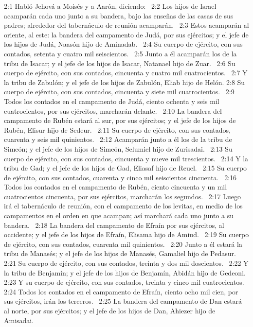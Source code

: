 2:1 Habló Jehová a Moisés y a Aarón, diciendo:  
2:2 Los hijos de Israel acamparán cada uno junto a su bandera, bajo las enseñas de las casas de sus padres; alrededor del tabernáculo de reunión acamparán.  
2:3 Estos acamparán al oriente, al este: la bandera del campamento de Judá, por sus ejércitos; y el jefe de los hijos de Judá, Naasón hijo de Aminadab.  
2:4 Su cuerpo de ejército, con sus contados, setenta y cuatro mil seiscientos.  
2:5 Junto a él acamparán los de la tribu de Isacar; y el jefe de los hijos de Isacar, Natanael hijo de Zuar.  
2:6 Su cuerpo de ejército, con sus contados, cincuenta y cuatro mil cuatrocientos.  
2:7 Y la tribu de Zabulón; y el jefe de los hijos de Zabulón, Eliab hijo de Helón. 
2:8 Su cuerpo de ejército, con sus contados, cincuenta y siete mil cuatrocientos.  
2:9 Todos los contados en el campamento de Judá, ciento ochenta y seis mil cuatrocientos, por sus ejércitos, marcharán delante.  
2:10 La bandera del campamento de Rubén estará al sur, por sus ejércitos; y el jefe de los hijos de Rubén, Elisur hijo de Sedeur.  
2:11 Su cuerpo de ejército, con sus contados, cuarenta y seis mil quinientos.  
2:12 Acamparán junto a él los de la tribu de Simeón; y el jefe de los hijos de Simeón, Selumiel hijo de Zurisadai.  
2:13 Su cuerpo de ejército, con sus contados, cincuenta y nueve mil trescientos.  
2:14 Y la tribu de Gad; y el jefe de los hijos de Gad, Eliasaf hijo de Reuel.  
2:15 Su cuerpo de ejército, con sus contados, cuarenta y cinco mil seiscientos cincuenta.  
2:16 Todos los contados en el campamento de Rubén, ciento cincuenta y un mil cuatrocientos cincuenta, por sus ejércitos, marcharán los segundos.  
2:17 Luego irá el tabernáculo de reunión, con el campamento de los levitas, en medio de los campamentos en el orden en que acampan; así marchará cada uno junto a su bandera.  
2:18 La bandera del campamento de Efraín por sus ejércitos, al occidente; y el jefe de los hijos de Efraín, Elisama hijo de Amiud.  
2:19 Su cuerpo de ejército, con sus contados, cuarenta mil quinientos.  
2:20 Junto a él estará la tribu de Manasés; y el jefe de los hijos de Manasés, Gamaliel hijo de Pedasur.  
2:21 Su cuerpo de ejército, con sus contados, treinta y dos mil doscientos.  
2:22 Y la tribu de Benjamín; y el jefe de los hijos de Benjamín, Abidán hijo de Gedeoni.  
2:23 Y su cuerpo de ejército, con sus contados, treinta y cinco mil cuatrocientos.  
2:24 Todos los contados en el campamento de Efraín, ciento ocho mil cien, por sus ejércitos, irán los terceros.  
2:25 La bandera del campamento de Dan estará al norte, por sus ejércitos; y el jefe de los hijos de Dan, Ahiezer hijo de Amisadai.  

